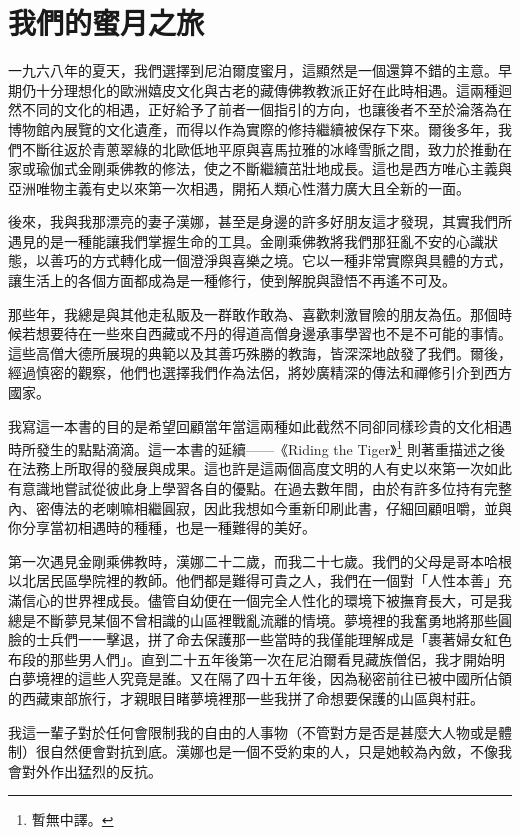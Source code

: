 \chapter{我們的蜜月之旅}
一九六八年的夏天，我們選擇到尼泊爾度蜜月，這顯然是一個還算不錯的主意。早期仍十分理想化的歐洲嬉皮文化與古老的藏傳佛教教派正好在此時相遇。這兩種迴然不同的文化的相遇，正好給予了前者一個指引的方向，也讓後者不至於淪落為在博物館內展覽的文化遺產，而得以作為實際的修持繼續被保存下來。爾後多年，我們不斷往返於青蔥翠綠的北歐低地平原與喜馬拉雅的冰峰雪脈之間，致力於推動在家或瑜伽式金剛乘佛教的修法，使之不斷繼續茁壯地成長。這也是西方唯心主義與亞洲唯物主義有史以來第一次相遇，開拓人類心性潛力廣大且全新的一面。

後來，我與我那漂亮的妻子漢娜，甚至是身邊的許多好朋友這才發現，其實我們所遇見的是一種能讓我們掌握生命的工具。金剛乘佛教將我們那狂亂不安的心識狀態，以善巧的方式轉化成一個澄淨與喜樂之境。它以一種非常實際與具體的方式，讓生活上的各個方面都成為是一種修行，使到解脫與證悟不再遙不可及。

那些年，我總是與其他走私販及一群敢作敢為、喜歡刺激冒險的朋友為伍。那個時候若想要待在一些來自西藏或不丹的得道高僧身邊承事學習也不是不可能的事情。這些高僧大德所展現的典範以及其善巧殊勝的教誨，皆深深地啟發了我們。爾後，經過慎密的觀察，他們也選擇我們作為法侶，將妙廣精深的傳法和禪修引介到西方國家。

我寫這一本書的目的是希望回顧當年當這兩種如此截然不同卻同樣珍貴的文化相遇時所發生的點點滴滴。這一本書的延續——《Riding the Tiger》\footnote{暫無中譯。}%
則著重描述之後在法務上所取得的發展與成果。這也許是這兩個高度文明的人有史以來第一次如此有意識地嘗試從彼此身上學習各自的優點。在過去數年間，由於有許多位持有完整內、密傳法的老喇嘛相繼圓寂，因此我想如今重新印刷此書，仔細回顧咀嚼，並與你分享當初相遇時的種種，也是一種難得的美好。

第一次遇見金剛乘佛教時，漢娜二十二歲，而我二十七歲。我們的父母是哥本哈根以北居民區學院裡的教師。他們都是難得可貴之人，我們在一個對「人性本善」充滿信心的世界裡成長。儘管自幼便在一個完全人性化的環境下被撫育長大，可是我總是不斷夢見某個不曾相識的山區裡戰亂流離的情境。夢境裡的我奮勇地將那些圓臉的士兵們一一擊退，拼了命去保護那一些當時的我僅能理解成是「裹著婦女紅色布段的那些男人們」。直到二十五年後第一次在尼泊爾看見藏族僧侶，我才開始明白夢境裡的這些人究竟是誰。又在隔了四十五年後，因為秘密前往已被中國所佔領的西藏東部旅行，才親眼目睹夢境裡那一些我拼了命想要保護的山區與村莊。

我這一輩子對於任何會限制我的自由的人事物（不管對方是否是甚麼大人物或是體制）很自然便會對抗到底。漢娜也是一個不受約束的人，只是她較為內斂，不像我會對外作出猛烈的反抗。

